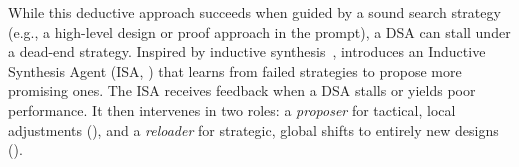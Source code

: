%

While this deductive approach succeeds when guided by a sound search strategy (e.g., a high-level design or proof approach in the prompt), a DSA can stall under a dead-end strategy. Inspired by inductive synthesis~\cite{cegis,sketch,clarke2000counterexample}, \sys{} introduces an Inductive Synthesis Agent (ISA, ) that learns from failed strategies to propose more promising ones. The ISA receives feedback when a DSA stalls or yields poor performance. It then intervenes in two roles: a \emph{proposer} for tactical, local adjustments (), and a \emph{reloader} for strategic, global shifts to entirely new designs ().

